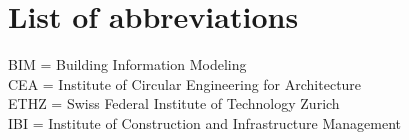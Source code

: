 %
\section*{List of abbreviations}
%
BIM = Building Information Modeling\\
CEA = Institute of Circular Engineering for Architecture\\
ETHZ = Swiss Federal Institute of Technology Zurich\\
IBI = Institute of Construction and Infrastructure Management\\

